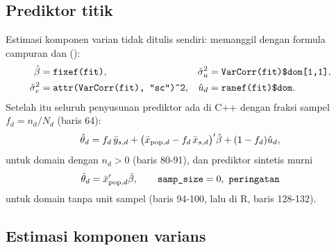 \subsection{Prediktor titik}\label{sec:bhf-prediktor}

Estimasi komponen varian tidak ditulis sendiri:  memanggil
 \citep{bates2015lme4} dengan formula campuran
 dan
 ():
\begin{equation}
\begin{aligned}
  \hat\beta&=\texttt{fixef(fit)}, &
  \hat\sigma_u^2&=\texttt{VarCorr(fit)\$dom[1,1]},\\
  \hat\sigma_e^2&=\texttt{attr(VarCorr(fit), "sc")\textasciicircum2}, &
  \hat u_d&=\texttt{ranef(fit)\$dom}.
\end{aligned}
  \label{eq:bhf-lmer}
\end{equation}
Setelah itu seluruh penyusunan prediktor ada di C++ dengan fraksi sampel
$f_d=n_d/N_d$ (baris 64):
\begin{equation}
  \hat\theta_d
  = f_d\,\bar y_{s,d}
  + \bigl(\bar x_{\text{pop},d}-f_d\,\bar x_{s,d}\bigr)'\hat\beta
  + (1-f_d)\hat u_d,
  \label{eq:bhf-pred}
\end{equation}
untuk domain dengan $n_d>0$ (baris 80-91), dan prediktor sintetis murni
\begin{equation}
  \hat\theta_d=\bar x_{\text{pop},d}'\hat\beta,
  \qquad \texttt{samp\_size}=0,\ \texttt{peringatan}
  \label{eq:bhf-unsampled}
\end{equation}
untuk domain tanpa unit sampel (baris 94-100, lalu  di R,
baris 128-132).


\subsection{Estimasi komponen varians}\label{sec:bhf-varians}

